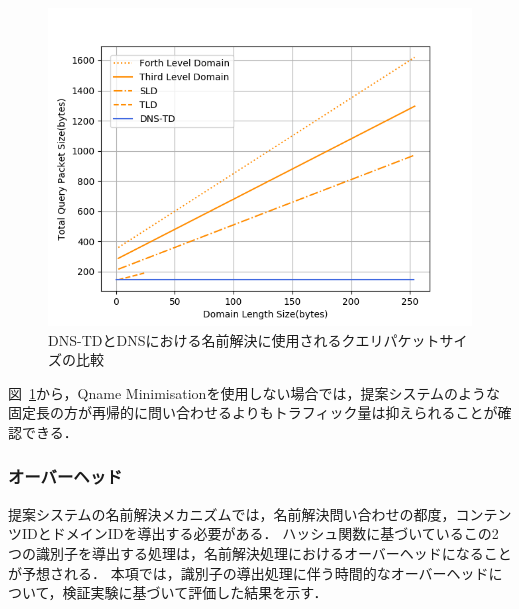 \begin{figure}[htbp]
 \centering
 \includegraphics[scale=0.8]{figure/length-size.png}
 \caption[DNSと提案システムのクエリパケットサイズ比較]{DNS-TDとDNSにおける名前解決に使用されるクエリパケットサイズの比較}
 \label{fig:length-size}
\end{figure}


図~\ref{fig:length-size}から，Qname Minimisationを使用しない場合では，提案システムのような固定長の方が再帰的に問い合わせるよりもトラフィック量は抑えられることが確認できる．

%


\newpage
\subsubsection{オーバーヘッド}
提案システムの名前解決メカニズムでは，名前解決問い合わせの都度，コンテンツIDとドメインIDを導出する必要がある．
ハッシュ関数に基づいているこの2つの識別子を導出する処理は，名前解決処理におけるオーバーヘッドになることが予想される．
本項では，識別子の導出処理に伴う時間的なオーバーヘッドについて，検証実験に基づいて評価した結果を示す．

